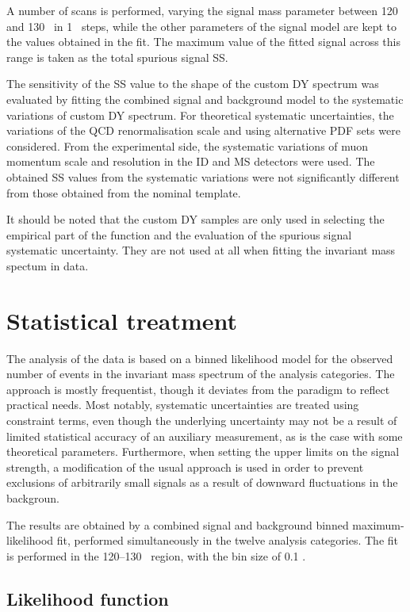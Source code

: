 A number of scans is performed, varying the signal mass parameter
between 120 and 130 \GeV~in 1 \GeV~steps, while the other parameters
of the signal model are kept to the values obtained in the fit.
The maximum value of the fitted signal across this range is taken
as the total spurious signal SS.

The sensitivity of the SS value to the shape of the custom DY
spectrum was evaluated by fitting the combined signal and
background model to the systematic variations of custom DY
spectrum. For theoretical systematic uncertainties, the variations
of the QCD renormalisation scale and using alternative PDF sets
were considered. From the experimental side, the systematic
variations of muon momentum scale and resolution in the ID and
MS detectors were used. The obtained SS values from the
systematic variations were not significantly different from
those obtained from the nominal template.

It should be noted that the custom DY samples are only used in
selecting the empirical part of the function and the evaluation
of the spurious signal systematic uncertainty. They are not used
at all when fitting the invariant mass spectum in data.

\section{Statistical treatment}

The analysis of the data is based on a binned likelihood model
for the observed number of events in the invariant mass spectrum
of the analysis categories. The approach is mostly frequentist,
though it deviates from the paradigm to reflect practical needs.
Most notably, systematic uncertainties are treated using
constraint terms, even though the underlying uncertainty may not
be a result of limited statistical accuracy of an auxiliary
measurement, as is the case with some theoretical parameters.
Furthermore, when setting the upper limits on the signal
strength, a modification of the usual approach is used in order
to prevent exclusions of arbitrarily small signals as a result
of downward fluctuations in the backgroun.

The results are obtained by a combined signal and background
binned maximum-likelihood fit, performed simultaneously in the
twelve analysis categories. The fit is performed in the 120--130
\GeV~region, with the bin size of 0.1 \GeV.

\subsection{Likelihood function}

